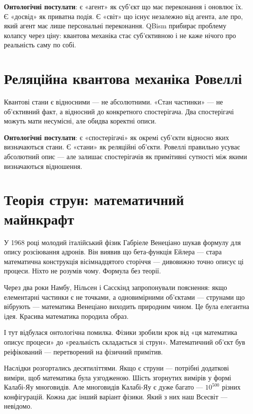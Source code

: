 \documentclass[12pt, a4paper, openany]{book}
\begin{document}
\textbf{Онтологічні постулати}: є «агент» як суб'єкт що має переконання і оновлює їх. Є «досвід» як приватна подія. Є «світ» що існує незалежно від агента, але про, який агент має лише персональні переконання. QBism прибирає проблему колапсу через ціну: квантова механіка стає суб'єктивною і не каже нічого про реальність саму по собі.

\section{Реляційна квантова механіка Ровеллі}

Квантові стани є відносними — не абсолютними. «Стан частинки» — не об'єктивний факт, а відносний до конкретного спостерігача. Два спостерігачі можуть мати несумісні, але обидва коректні описи.

\textbf{Онтологічні постулати}: є «спостерігачі» як окремі суб'єкти відносно яких визначаються стани. Є «стани» як реляційні об'єкти. Ровеллі правильно усуває абсолютний опис — але залишає спостерігачів як примітивні сутності між якими визначаються відношення.

\section{Теорія струн: математичний майнкрафт}

У 1968 році молодий італійський фізик Габріеле Венеціано шукав формулу для опису розсіювання адронів. Він виявив що бета-функція Ейлера — стара математична конструкція вісімнадцятого сторіччя — дивовижно точно описує ці процеси. Ніхто не розумів чому. Формула без теорії.

Через два роки Намбу, Нільсен і Сасскінд запропонували пояснення: якщо елементарні частинки є не точками, а одновимірними об'єктами — струнами що вібрують — математика Венеціано виходить природним чином. Це була елегантна ідея. Красива математика породила образ.

І тут відбулася онтологічна помилка. Фізики зробили крок від «ця математика описує процеси» до «реальність складається зі струн». Математичний об'єкт був реіфікований — перетворений на фізичний примітив.

Наслідки розгортались десятиліттями. Якщо є струни — потрібні додаткові виміри, щоб математика була узгодженою. Шість згорнутих вимірів у формі Калабі-Яу многовидів. Але многовидів Калабі-Яу є дуже багато — $10^{500}$ різних конфігурацій. Кожна дає інший варіант фізики. Який з них наш Всесвіт — невідомо.
\end{document}
